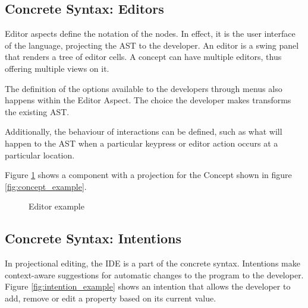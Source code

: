 \subsection{Concrete Syntax: Editors}
Editor aspects define the notation of the nodes.
In effect, it is the user interface of the language, projecting the AST to the developer.
An editor is a swing panel that renders a tree of editor cells.
A concept can have multiple editors, thus offering multiple views on it.

The definition of the options available to the developers through menus also happens within the Editor Aspect. 
The choice the developer makes transforms the existing AST.

Additionally, the behaviour of interactions can be defined, such as what will happen to the AST when a particular keypress or editor action occurs at a particular location.

Figure \ref{fig:editor_example} shows a component with a projection for the Concept shown in figure \ref{fig:concept_example}.

\begin{figure}
    \centering
    \caption{Editor example}
    \label{fig:editor_example}
\end{figure}

\subsection{Concrete Syntax: Intentions}

In projectional editing, the IDE is a part of the concrete syntax.
Intentions make context-aware suggestions for automatic changes to the program to the developer.
Figure \ref{fig:intention_example} shows an intention that allows the developer to add, remove or edit a property based on its current value.

